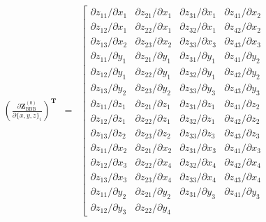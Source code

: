 \begin{eqnarray}
\left(\frac{
	\partial{\mathbf{Z}^{(0)}_{\mathrm{BBB}}}}{\partial{\{x, y, z\}_i}}
\right)^\mathbf{T}
& = &
\left[\begin{array}{cccc}
\partial{z_{11}} / \partial{x_1} & \partial{z_{21}} / \partial{x_1} &
\partial{z_{31}} / \partial{x_1} & \partial{z_{41}} / \partial{x_2} \\
\partial{z_{12}} / \partial{x_1} & \partial{z_{22}} / \partial{x_1} &
\partial{z_{32}} / \partial{x_1} & \partial{z_{42}} / \partial{x_2} \\
\partial{z_{13}} / \partial{x_2} & \partial{z_{23}} / \partial{x_2} &
\partial{z_{33}} / \partial{x_3} & \partial{z_{43}} / \partial{x_3} \\
\partial{z_{11}} / \partial{y_1} & \partial{z_{21}} / \partial{y_1} &
\partial{z_{31}} / \partial{y_1} & \partial{z_{41}} / \partial{y_2} \\
\partial{z_{12}} / \partial{y_1} & \partial{z_{22}} / \partial{y_1} &
\partial{z_{32}} / \partial{y_1} & \partial{z_{42}} / \partial{y_2} \\
\partial{z_{13}} / \partial{y_2} & \partial{z_{23}} / \partial{y_2} &
\partial{z_{33}} / \partial{y_3} & \partial{z_{43}} / \partial{y_3} \\
\partial{z_{11}} / \partial{z_1} & \partial{z_{21}} / \partial{z_1} &
\partial{z_{31}} / \partial{z_1} & \partial{z_{41}} / \partial{z_2} \\
\partial{z_{12}} / \partial{z_1} & \partial{z_{22}} / \partial{z_1} &
\partial{z_{32}} / \partial{z_1} & \partial{z_{42}} / \partial{z_2} \\
\partial{z_{13}} / \partial{z_2} & \partial{z_{23}} / \partial{z_2} &
\partial{z_{33}} / \partial{z_3} & \partial{z_{43}} / \partial{z_3} \\
\partial{z_{11}} / \partial{x_2} & \partial{z_{21}} / \partial{x_2} &
\partial{z_{31}} / \partial{x_3} & \partial{z_{41}} / \partial{x_3} \\
\partial{z_{12}} / \partial{x_3} & \partial{z_{22}} / \partial{x_4} &
\partial{z_{32}} / \partial{x_4} & \partial{z_{42}} / \partial{x_4} \\
\partial{z_{13}} / \partial{x_3} & \partial{z_{23}} / \partial{x_4} &
\partial{z_{33}} / \partial{x_4} & \partial{z_{43}} / \partial{x_4} \\
\partial{z_{11}} / \partial{y_2} & \partial{z_{21}} / \partial{y_2} &
\partial{z_{31}} / \partial{y_3} & \partial{z_{41}} / \partial{y_3} \\
\partial{z_{12}} / \partial{y_3} & \partial{z_{22}} / \partial{y_4} &

\end{array}
\end{eqnarray}
